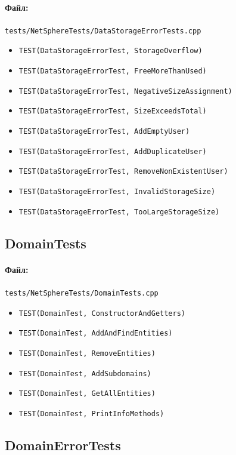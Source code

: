 \documentclass[14pt,a4paper]{extarticle}
\begin{document}
\paragraph{Файл:} \texttt{tests/NetSphereTests/DataStorageErrorTests.cpp}
\begin{itemize}
  \item \texttt{TEST(DataStorageErrorTest, StorageOverflow)}
  \item \texttt{TEST(DataStorageErrorTest, FreeMoreThanUsed)}
  \item \texttt{TEST(DataStorageErrorTest, NegativeSizeAssignment)}
  \item \texttt{TEST(DataStorageErrorTest, SizeExceedsTotal)}
  \item \texttt{TEST(DataStorageErrorTest, AddEmptyUser)}
  \item \texttt{TEST(DataStorageErrorTest, AddDuplicateUser)}
  \item \texttt{TEST(DataStorageErrorTest, RemoveNonExistentUser)}
  \item \texttt{TEST(DataStorageErrorTest, InvalidStorageSize)}
  \item \texttt{TEST(DataStorageErrorTest, TooLargeStorageSize)}
\end{itemize}

\subsection{DomainTests}
\paragraph{Файл:} \texttt{tests/NetSphereTests/DomainTests.cpp}
\begin{itemize}
  \item \texttt{TEST(DomainTest, ConstructorAndGetters)}
  \item \texttt{TEST(DomainTest, AddAndFindEntities)}
  \item \texttt{TEST(DomainTest, RemoveEntities)}
  \item \texttt{TEST(DomainTest, AddSubdomains)}
  \item \texttt{TEST(DomainTest, GetAllEntities)}
  \item \texttt{TEST(DomainTest, PrintInfoMethods)}
\end{itemize}

\subsection{DomainErrorTests}
\end{document}
